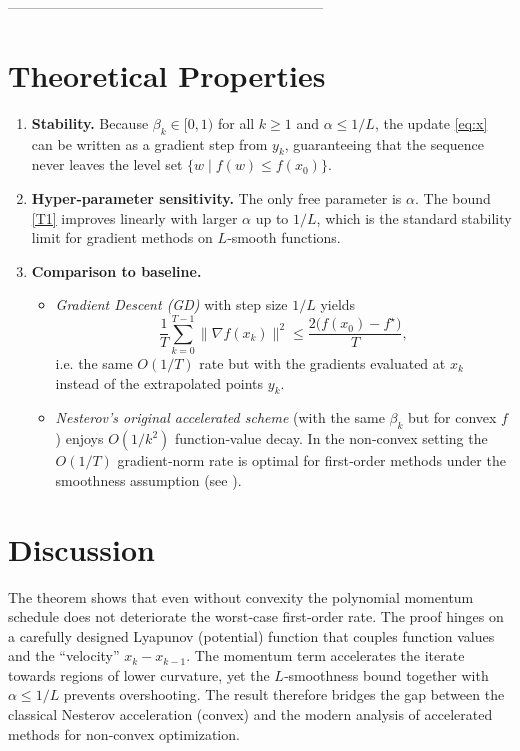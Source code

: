 \documentclass{article}
\begin{document}
--------------------------------------------------------------------

\section*{Theoretical Properties}
\begin{enumerate}
\item \textbf{Stability.} Because $\beta_k\in[0,1)$ for all $k\ge1$ and $\alpha\le 1/L$, the update \eqref{eq:x} can be written as a gradient step from $y_k$, guaranteeing that the sequence never leaves the level set $\{w\mid f(w)\le f(x_0)\}$.

\item \textbf{Hyper‑parameter sensitivity.} The only free parameter is $\alpha$. The bound \eqref{T1} improves linearly with larger $\alpha$ up to $1/L$, which is the standard stability limit for gradient methods on $L$‑smooth functions.

\item \textbf{Comparison to baseline.}
\begin{itemize}
\item \emph{Gradient Descent (GD)} with step size $1/L$ yields
\[
\frac{1}{T}\sum_{k=0}^{T-1}\|\nabla f(x_k)\|^2\le\frac{2\bigl(f(x_0)-f^\star\bigr)}{T},
\]
i.e. the same $O(1/T)$ rate but with the gradients evaluated at $x_k$ instead of the extrapolated points $y_k$.
\item \emph{Nesterov’s original accelerated scheme} (with the same $\beta_k$ but for convex $f$) enjoys $O(1/k^2)$ function‑value decay. In the non‑convex setting the $O(1/T)$ gradient‑norm rate is optimal for first‑order methods under the smoothness assumption (see \cite{ghadimi2016accelerated}).
\end{itemize}
\end{enumerate}

\section*{Discussion}
The theorem shows that even without convexity the polynomial momentum schedule does not deteriorate the worst‑case first‑order rate. The proof hinges on a carefully designed Lyapunov (potential) function that couples function values and the “velocity” $x_k-x_{k-1}$. The momentum term accelerates the iterate towards regions of lower curvature, yet the $L$‑smoothness bound together with $\alpha\le 1/L$ prevents overshooting. The result therefore bridges the gap between the classical Nesterov acceleration (convex) and the modern analysis of accelerated methods for non‑convex optimization.
\end{document}
